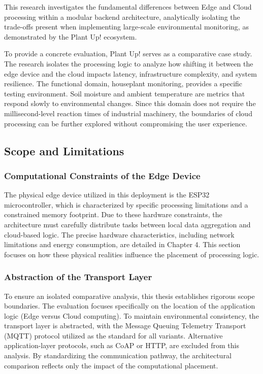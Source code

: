 This research investigates the fundamental differences between Edge and Cloud processing within a modular backend architecture, analytically isolating the trade-offs present when implementing large-scale environmental monitoring, as demonstrated by the Plant Up! ecosystem.

To provide a concrete evaluation, Plant Up! serves as a comparative case study. The research isolates the processing logic to analyze how shifting it between the edge device and the cloud impacts latency, infrastructure complexity, and system resilience. The functional domain, houseplant monitoring, provides a specific testing environment. Soil moisture and ambient temperature are metrics that respond slowly to environmental changes. Since this domain does not require the millisecond-level reaction times of industrial machinery, the boundaries of cloud processing can be further explored without compromising the user experience.

\subsection{Scope and Limitations}

\subsubsection{Computational Constraints of the Edge Device}

The physical edge device utilized in this deployment is the ESP32 microcontroller, which is characterized by specific processing limitations and a constrained memory footprint. Due to these hardware constraints, the architecture must carefully distribute tasks between local data aggregation and cloud-based logic. The precise hardware characteristics, including network limitations and energy consumption, are detailed in Chapter 4. This section focuses on how these physical realities influence the placement of processing logic.

\subsubsection{Abstraction of the Transport Layer}

To ensure an isolated comparative analysis, this thesis establishes rigorous scope boundaries. The evaluation focuses specifically on the location of the application logic (Edge versus Cloud computing). To maintain environmental consistency, the transport layer is abstracted, with the Message Queuing Telemetry Transport (MQTT) protocol utilized as the standard for all variants. Alternative application-layer protocols, such as CoAP or HTTP, are excluded from this analysis. By standardizing the communication pathway, the architectural comparison reflects only the impact of the computational placement.
